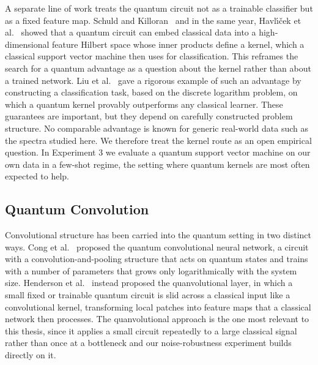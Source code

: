 A separate line of work treats the quantum circuit not as a trainable classifier but
as a fixed feature map. Schuld and Killoran~\cite{schuld2019feature} and in the same
year, Havl{\'\i}{\v{c}}ek et al.~\cite{havlicek2019} showed that a quantum circuit can
embed classical data into a high-dimensional feature Hilbert space whose inner
products define a kernel, which a classical support vector machine then uses for
classification. This reframes the search for a quantum advantage as a question about
the kernel rather than about a trained network. Liu et al.~\cite{liu2021speedup} gave
a rigorous example of such an advantage by constructing a classification task, based
on the discrete logarithm problem, on which a quantum kernel provably outperforms any
classical learner. These guarantees are important, but they depend on carefully
constructed problem structure. No comparable advantage is known for generic
real-world data such as the spectra studied here. We therefore treat the kernel route
as an open empirical question. In Experiment 3 we evaluate a quantum support vector
machine on our own data in a few-shot regime, the setting where quantum kernels are
most often expected to help.

\subsection{Quantum Convolution}
\label{sec:rel_quanv}

Convolutional structure has been carried into the quantum setting in two distinct
ways. Cong et al.~\cite{cong2019qcnn} proposed the quantum convolutional neural
network, a circuit with a convolution-and-pooling structure that acts on quantum
states and trains with a number of parameters that grows only logarithmically with
the system size. Henderson et al.~\cite{henderson2020quanvolutional} instead
proposed the quanvolutional layer, in which a small fixed or trainable quantum
circuit is slid across a classical input like a convolutional kernel, transforming
local patches into feature maps that a classical network then processes. The
quanvolutional approach is the one most relevant to this thesis, since it applies a
small circuit repeatedly to a large classical signal rather than once at a bottleneck
and our noise-robustness experiment builds directly on it.

